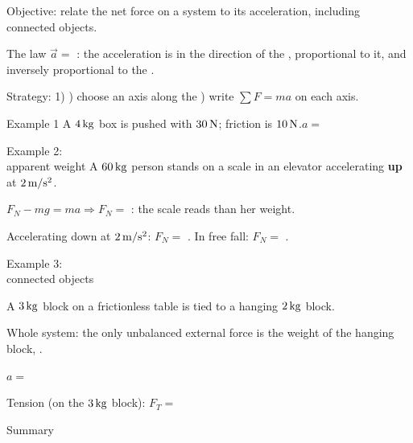 \begin{center}\textsf{\small\color{apgrey}Objective: relate the net force on a system to its acceleration, including connected objects.}\end{center}
\begin{nrow}{The law}
$\vec a=$ : the acceleration is in the direction of the , proportional to it, and inversely proportional to the .\par
Strategy: 1)  ) choose an axis along the  ) write $\sum F=ma$ on each axis.
\end{nrow}
\begin{nrow}{Example 1}
A $4\,\mathrm{kg}$ box is pushed with $30\,\mathrm{N}$; friction is $10\,\mathrm{N}$.\quad $a=$ 
\end{nrow}
\begin{nrow}{Example 2:\\ apparent weight}
A $60\,\mathrm{kg}$ person stands on a scale in an elevator accelerating \textbf{up} at $2\,\mathrm{m/s^2}$.\par
$F_N-mg=ma\Rightarrow F_N=$ : the scale reads  than her weight.\par
Accelerating down at $2\,\mathrm{m/s^2}$: $F_N=$ . \quad In free fall: $F_N=$ .
\end{nrow}
\begin{nrow}{Example 3:\\ connected objects}
\begin{minipage}[t]{0.6\linewidth}
A $3\,\mathrm{kg}$ block on a frictionless table is tied to a hanging $2\,\mathrm{kg}$ block.\par
Whole system: the only unbalanced external force is the weight of the hanging block, \fillin{$20\N$}.\par
$a=$ \par
Tension (on the $3\,\mathrm{kg}$ block): $F_T=$ 
\end{minipage}\hfill
\begin{minipage}[t]{0.34\linewidth}\vspace{0pt}
\end{minipage}
\end{nrow}
\begin{nrow}{Summary}
\else\vspace{2.2cm}\fi
\end{nrow}

